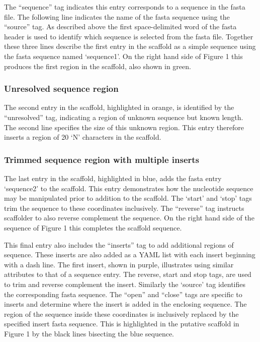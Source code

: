 \documentclass[10pt]{bmc_article}
\newenvironment{bmcformat}{\begin{raggedright}\baselineskip20pt\sloppy\setboolean{publ}{false}}{\end{raggedright}\baselineskip20pt\sloppy}
\begin{document}
\begin{bmcformat}
The ``sequence'' tag indicates this entry corresponds to a sequence in the
fasta file. The following line indicates the name of the fasta sequence using
the ``source'' tag. As described above the first space-delimited word of the
fasta header is used to identify which sequence is selected from the fasta
file. Together these three lines describe the first entry in the scaffold as
a simple sequence using the fasta sequence named `sequence1'. On the right hand
side of Figure 1 this produces the first region in the scaffold, also shown in
green. \pb

\subsubsection*{Unresolved sequence region} %

The second entry in the scaffold, highlighted in orange, is identified by the
``unresolved'' tag, indicating a region of unknown sequence but known length.
The second line specifies the size of this unknown region. This entry therefore
inserts a region of 20 `N' characters in the scaffold. \pb

\subsubsection*{Trimmed sequence region with multiple inserts} %

The last entry in the scaffold, highlighted in blue, adds the fasta entry
`sequence2' to the scaffold. This entry demonstrates how the nucleotide
sequence may be manipulated prior to addition to the scaffold. The `start' and
`stop' tags trim the sequence to these coordinates inclusively. The ``reverse''
tag instructs scaffolder to also reverse complement the sequence. On the right
hand side of the sequence of Figure 1 this completes the scaffold sequence. \pb

This final entry also includes the ``inserts'' tag to add additional regions of
sequence. These inserts are also added as a YAML list with each insert
beginning with a dash line. The first insert, shown in purple, illustrates
using similar attributes to that of a sequence entry. The reverse, start and
stop tags, are used to trim and reverse complement the insert. Similarly the
`source' tag identifies the corresponding fasta sequence. The ``open'' and
``close'' tags are specific to inserts and determine where the insert is added
in the enclosing sequence. The region of the sequence inside these coordinates
is inclusively replaced by the specified insert fasta sequence. This is
highlighted in the putative scaffold in Figure 1 by the black lines bisecting
the blue sequence. \pb


\end{bmcformat}
\end{document}
